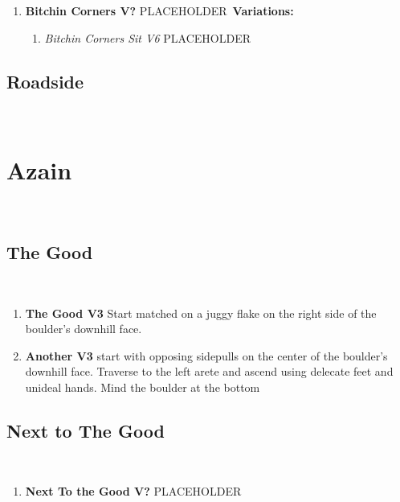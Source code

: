 \begin{enumerate}[]
	\item\label{rt:Bitchin Corners} \colorbox{black!20}{\textbf{Bitchin Corners V?  } }
	\newline PLACEHOLDER\
	\newline \textbf{Variations:}
	\begin{enumerate}
		\item\label{vr:Bitchin Corners Sit} \colorbox{Goldenrod!50}{\emph{Bitchin Corners Sit V6  }  }
		\newline PLACEHOLDER\
	\end{enumerate}
\end{enumerate}
\subsection*{Roadside}\label{bf:Roadside}
\

\section{Azain}\label{sa:Azain}
\

\subsection*{The Good}\label{bf:The Good}
\

\begin{enumerate}[]
	\item\label{rt:The Good} \colorbox{green!20}{\textbf{The Good V3     } }
	\newline Start matched on a juggy flake on the right side of the boulder's downhill face.\
	\item\label{rt:Another} \colorbox{green!20}{\textbf{Another V3    \warn } }
	\newline start with opposing sidepulls on the center of the boulder's downhill face. Traverse to the left arete and ascend using delecate feet and unideal hands. Mind the boulder at the bottom\
\end{enumerate}
\subsection*{Next to The Good}\label{bf:Next to The Good}
\

\begin{enumerate}[resume]
	\item\label{rt:Next To the Good} \colorbox{black!20}{\textbf{Next To the Good V?  \warn } }
	\newline PLACEHOLDER\
\end{enumerate}
